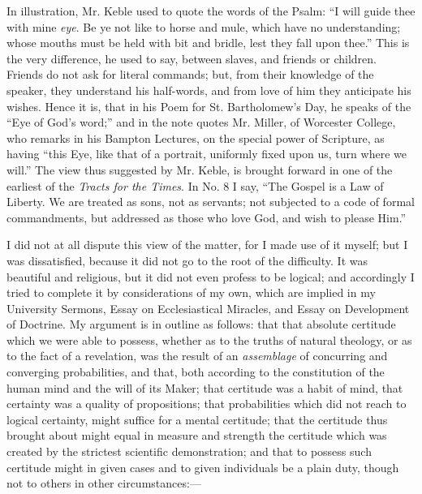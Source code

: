 In illustration, Mr. Keble used to quote the words of the Psalm:
``I will guide thee with mine \emph{eye}. Be ye not like to horse
and mule, which have no understanding; whose mouths must be held with
bit and bridle, lest they fall upon thee.'' This is the very
difference, he used to say, between slaves, and friends or children.
Friends do not ask for literal commands; but, from their knowledge of
the speaker, they understand his half-words, and from love of him they
anticipate his wishes. Hence it is, that in his Poem for St.
Bartholomew's Day, he speaks of the ``Eye of God's word;'' and
in the note quotes Mr. Miller, of Worcester College, who remarks in
his Bampton Lectures, on the special power of Scripture, as
having ``this Eye, like that of a portrait, uniformly fixed upon
us, turn where we will.'' The view thus suggested by Mr. Keble, is
brought forward in one of the earliest of the \emph{Tracts for the Times}. In No. 8 I say, ``The Gospel is a Law of Liberty. We
are treated as sons, not as servants; not subjected to a code of
formal commandments, but addressed as those who love God, and wish to
please Him.''

I did not at all dispute this view of the matter, for I made use of
it myself; but I was dissatisfied, because it did not go to the root
of the difficulty. It was beautiful and religious, but it did not even
profess to be logical; and accordingly I tried to complete it by
considerations of my own, which are implied in my University
Sermons,
Essay on Ecclesiastical Miracles, and Essay on Development of
Doctrine. My argument is in outline as follows: that that absolute
certitude which we were able to possess, whether as to the truths of
natural theology, or as to the fact of a revelation, was the result of
an \emph{assemblage} of concurring and converging probabilities, and
that, both according to the constitution of the human mind and the
will of its Maker; that certitude was a habit of mind, that certainty
was a quality of propositions; that probabilities which did not reach
to logical certainty, might suffice for a mental certitude; that the certitude thus
brought about might equal in measure and strength the certitude which was
created by the strictest scientific demonstration; and that to possess such certitude might in given cases and to
given individuals
be a plain duty, though not to others in other circumstances:—

